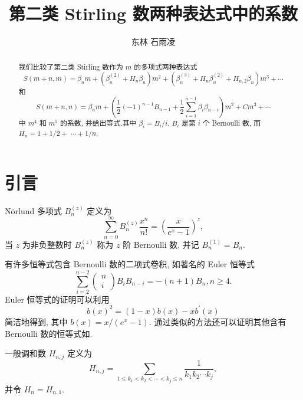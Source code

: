 \documentclass{CombPaper}
\begin{document}
\title{\Large{第二类 Stirling 数两种表达式中的系数}}

\author{东林 \quad 石雨凌}
\address{上海财经大学数学学院,  上海 200433}


\maketitle

\begin{abstract}
	我们比较了第二类 Stirling 数作为 $m$ 的多项式两种表达式
	$$
S(m+n,  m)=\beta_{n} m+\left(\beta_{n}^{(2)}+H_{n} \beta_{n}\right) m^{2}+\left(\beta_{n}^{(3)}+H_{n} \beta_{n}^{(2)}+H_{n,  2} \beta_{n}\right) m^{3}+\cdots
$$
和
$$
S(m+n,  n)=\beta_{n} m+\left(\frac{1}{2}(-1)^{n-1} B_{n-1}+\frac{1}{2} \sum_{i=1}^{n-1} \beta_{i} \beta_{n-i}\right) m^{2}+C m^{3}+\cdots
$$
中 $m^4$ 和 $m^5$ 的系数,  并给出等式.其中 $\beta_{i}=B_{i} / i$,  $B_{i}$ 是第 $i$ 个 Bernoulli 数,  而 $H_{n}=1+1 / 2+$ $\cdots+1 / n$.
\end{abstract}

\section{引言}
Nörlund 多项式 $B_{n}^{(z)}$ 定义为
\begin{equation}\label{norlund_def}
\sum_{n=0}^{\infty} B_{n}^{(z)} \frac{x^{n}}{n !}=\left(\frac{x}{e^{x}-1}\right)^{z}, 
\end{equation}
当 $z$ 为非负整数时 $B_{n}^{(z)}$ 称为 $z$ 阶 Bernoulli 数, 并记 $B_{n}^{(1)}=B_{n}$.

有许多恒等式包含 Bernoulli 数的二项式卷积,  如著名的 Euler 恒等式
$$
\sum_{i=2}^{n-2}\left(\begin{array}{l}
n \\
i
\end{array}\right) B_{i} B_{n-i}=-(n+1) B_{n},  n\geq4.
$$ Euler 恒等式的证明可以利用 $$
b(x)^{2}=(1-x) b(x)-x b^{\prime}(x) 
$$ 简洁地得到,  其中 $b(x)=x /\left(e^{x}-1\right)$. 通过类似的方法还可以证明其他含有 Bernoulli 数的恒等式如\cite{dilcher1996sums, huang1999bernoulli}.

一般调和数 $H_{n,  j}$ 定义为 
\begin{equation}\label{harmonic_gen}
H_{n,  j}=\sum_{1 \leq k_{1}<k_{2}<\cdots<k_{j} \leq n} \frac{1}{k_{1} k_{2} \cdots k_{j}}, 
\end{equation}
并令 $H_{n}=H_{n,  1}$.
\end{document}
